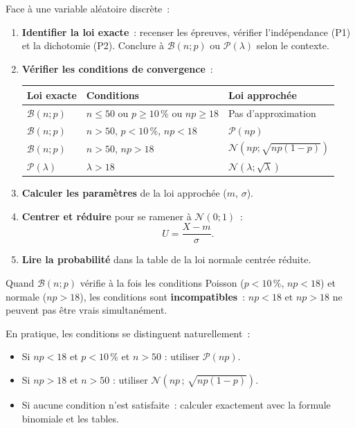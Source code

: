\documentclass[11pt,a4paper]{article}
\begin{document}
\begin{methbox}
Face \`a une variable al\'eatoire discr\`ete~:
\begin{enumerate}
  \item \textbf{Identifier la loi exacte}~: recenser les \'epreuves, v\'erifier l'ind\'ependance (P1) et la dichotomie (P2). Conclure \`a $\mathcal{B}(n;p)$ ou $\mathcal{P}(\lambda)$ selon le contexte.

  \item \textbf{V\'erifier les conditions de convergence}~:
  \begin{center}
  \begin{tabular}{lll}
  \toprule
  Loi exacte & Conditions & Loi approch\'ee \\
  \midrule
  $\mathcal{B}(n;p)$ & $n\leq 50$ ou $p\geq 10\,\%$ ou $np\geq 18$ & Pas d'approximation \\
  $\mathcal{B}(n;p)$ & $n>50$, $p<10\,\%$, $np<18$ & $\mathcal{P}(np)$ \\
  $\mathcal{B}(n;p)$ & $n>50$, $np>18$ & $\mathcal{N}(np;\sqrt{np(1-p)})$ \\
  $\mathcal{P}(\lambda)$ & $\lambda > 18$ & $\mathcal{N}(\lambda;\sqrt{\lambda})$ \\
  \bottomrule
  \end{tabular}
  \end{center}

  \item \textbf{Calculer les param\`etres} de la loi approch\'ee ($m$, $\sigma$).

  \item \textbf{Centrer et r\'eduire} pour se ramener \`a $\mathcal{N}(0;1)$~:
  $$U = \frac{X - m}{\sigma}.$$

  \item \textbf{Lire la probabilit\'e} dans la table de la loi normale centr\'ee r\'eduite.
\end{enumerate}
\end{methbox}

\begin{alertbox}
Quand $\mathcal{B}(n;p)$ v\'erifie \`a la fois les conditions Poisson ($p<10\,\%$, $np<18$) et normale ($np>18$), les conditions sont \textbf{incompatibles}~: $np<18$ et $np>18$ ne peuvent pas \^etre vrais simultan\'ement.

En pratique, les conditions se distinguent naturellement~:
\begin{itemize}
  \item Si $np < 18$ et $p < 10\,\%$ et $n > 50$ : utiliser $\mathcal{P}(np)$.
  \item Si $np > 18$ et $n > 50$ : utiliser $\mathcal{N}(np\,;\,\sqrt{np(1-p)})$.
  \item Si aucune condition n'est satisfaite~: calculer exactement avec la formule binomiale et les tables.
\end{itemize}
\end{alertbox}
\end{document}
